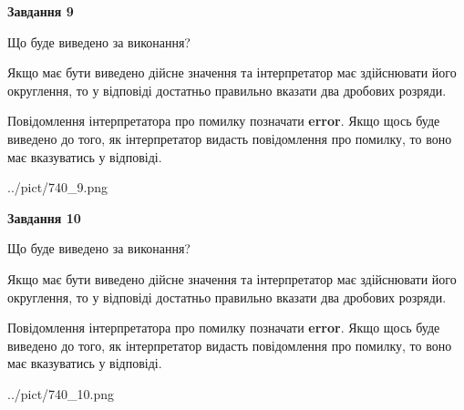 \documentclass[12pt, ukrainian]{article}
\begin{document}
{\begin {Large}
{\begin {center}\textbf{Завдання 9}\end {center}}\par
Що буде виведено за виконання? \par

Якщо має бути виведено дійсне значення та інтерпретатор має здійснювати його округлення, 
то у відповіді достатньо правильно вказати два дробових розряди.

Повідомлення інтерпретатора про помилку позначати \textbf{error}.
Якщо щось буде виведено до того, як інтерпретатор видасть повідомлення про помилку, 
то воно має вказуватись у відповіді. \par

\begin{center}
	{../pict/740_9.png}
\end{center}
\newpage

{\begin {center}\textbf{Завдання 10}\end {center}}\par
Що буде виведено за виконання? \par

Якщо має бути виведено дійсне значення та інтерпретатор має здійснювати його округлення, 
то у відповіді достатньо правильно вказати два дробових розряди.

Повідомлення інтерпретатора про помилку позначати \textbf{error}.
Якщо щось буде виведено до того, як інтерпретатор видасть повідомлення про помилку, 
то воно має вказуватись у відповіді. \par

\begin{center}
	{../pict/740_10.png}
\end{center}
\newpage

\end {Large}}
\end{document}
